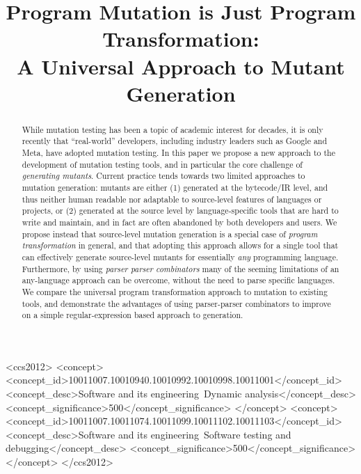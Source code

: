 \documentclass[sigconf,review, anonymous]{acmart}
\title{Program Mutation is Just Program Transformation: \\ A
  Universal Approach to Mutant Generation}
\begin{document}
\begin{abstract}
While mutation testing has been a topic of academic interest for
decades, it is only recently that ``real-world'' developers, including
industry leaders such as Google and Meta, have adopted mutation
testing.  In this paper we propose a new approach to the development of mutation
testing tools, and in particular the core challenge of
\emph{generating mutants}.  Current practice tends towards two
limited approaches to mutation generation: mutants are either (1)
generated at the bytecode/IR level, and thus neither human readable
nor adaptable to source-level features of languages or projects, or
(2) generated at the source level by language-specific tools that are
hard to write and maintain, and in fact are often abandoned by both
developers and users.  We propose instead that source-level mutation
generation is a special case of \emph{program transformation} in
general, and that adopting this approach allows for a single tool that
can effectively generate source-level mutants for essentially
\emph{any} programming language. Furthermore, by using \emph{parser
  parser combinators} many of the seeming limitations of an
any-language approach can be overcome, without the need to parse
specific languages.  We compare the universal program transformation
approach to mutation to existing tools, and demonstrate the advantages
of using parser-parser combinators to improve on a simple regular-expression
based approach to generation.  
\end{abstract}


\begin{CCSXML}
<ccs2012>
<concept>
<concept_id>10011007.10010940.10010992.10010998.10011001</concept_id>
<concept_desc>Software and its engineering~Dynamic analysis</concept_desc>
<concept_significance>500</concept_significance>
</concept>
<concept>
<concept_id>10011007.10011074.10011099.10011102.10011103</concept_id>
<concept_desc>Software and its engineering~Software testing and debugging</concept_desc>
<concept_significance>500</concept_significance>
</concept>
</ccs2012>
\end{CCSXML}


\maketitle
\end{document}
